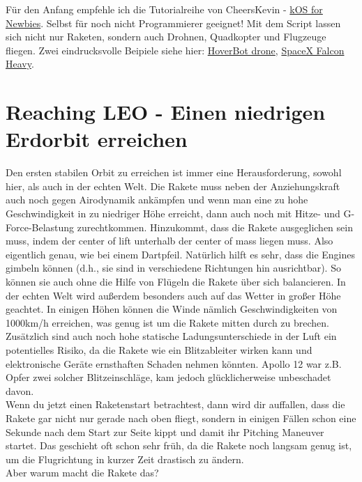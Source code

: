 \documentclass[12pt,paper=A4,numbers=noenddot,bibliography=totoc,listof=totoc,DIV=11,BCOR=1mm]{scrreprt}
\newcommand{\gq}[1]{\glqq #1\grqq} %
\begin{document}
Für den Anfang empfehle ich die Tutorialreihe von CheersKevin - \href{https://www.youtube.com/playlist?list=PLb6UbFXBdbCoCm1e65qfDOCdK_qIBtX3D}{kOS for Newbies}.
Selbst für noch nicht Programmierer geeignet! Mit dem Script lassen sich nicht nur Raketen, sondern auch Drohnen, Quadkopter und Flugzeuge fliegen.
Zwei eindrucksvolle Beipiele siehe hier: \href{https://youtu.be/f4SytD3xR0k}{HoverBot drone}, \href{https://youtu.be/oAzGwSFi9Qg}{SpaceX Falcon Heavy}.\\


\section{Reaching LEO - Einen niedrigen Erdorbit erreichen}
Den ersten stabilen Orbit zu erreichen ist immer eine Herausforderung, sowohl hier, als auch in der echten Welt. Die Rakete muss neben der Anziehungskraft auch noch gegen Airodynamik ankämpfen und wenn man eine zu hohe Geschwindigkeit in zu niedriger Höhe erreicht, dann auch noch mit Hitze- und G-Force-Belastung zurechtkommen. Hinzukommt, dass die Rakete ausgeglichen sein muss, indem der \gq{center of lift} unterhalb der \gq{center of mass} liegen muss. Also eigentlich genau, wie bei einem Dartpfeil. Natürlich hilft es sehr, dass die Engines \gq{gimbeln} können (d.h., sie sind in verschiedene Richtungen hin ausrichtbar). So können sie auch ohne die Hilfe von Flügeln die Rakete über sich balancieren. In der echten Welt wird außerdem besonders auch auf das \gq{Wetter} in großer Höhe geachtet. In einigen Höhen können die Winde nämlich Geschwindigkeiten von 1000km/h erreichen, was genug ist um die Rakete mitten durch zu brechen. Zusätzlich sind auch noch hohe statische Ladungsunterschiede in der Luft ein potentielles Risiko, da die Rakete wie ein Blitzableiter wirken kann und elektronische Geräte ernsthaften Schaden nehmen könnten. Apollo 12 war z.B. Opfer zwei solcher Blitzeinschläge, kam jedoch glücklicherweise unbeschadet davon.\\

Wenn du jetzt einen Raketenstart betrachtest, dann wird dir auffallen, dass die Rakete gar nicht nur gerade nach oben fliegt, sondern in einigen Fällen schon eine Sekunde nach dem Start zur Seite kippt und damit ihr \gq{Pitching Maneuver} startet. Das geschieht oft schon sehr früh, da die Rakete noch langsam genug ist, um die Flugrichtung in kurzer Zeit drastisch zu ändern.\\
Aber warum macht die Rakete das?\\
\end{document}
